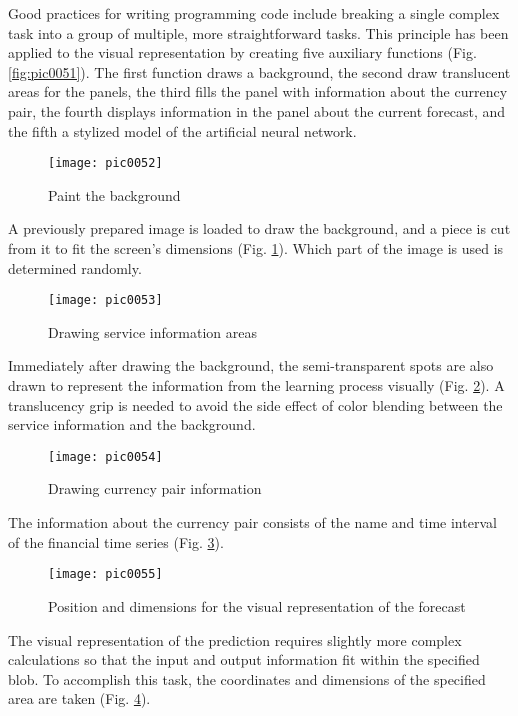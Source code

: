Good practices for writing programming code include breaking a single complex task into a group of multiple, more straightforward tasks. This principle has been applied to the visual representation by creating five auxiliary functions (Fig. \ref{fig:pic0051}). The first function draws a background, the second draw translucent areas for the panels, the third fills the panel with information about the currency pair, the fourth displays information in the panel about the current forecast, and the fifth a stylized model of the artificial neural network.

\begin{figure}[h]
\centering
\texttt{[image: pic0052]}
\caption{Paint the background}
\label{fig:pic0052}
\end{figure}
\FloatBarrier

A previously prepared image is loaded to draw the background, and a piece is cut from it to fit the screen's dimensions (Fig. \ref{fig:pic0052}). Which part of the image is used is determined randomly.

\begin{figure}[h]
\centering
\texttt{[image: pic0053]}
\caption{Drawing service information areas}
\label{fig:pic0053}
\end{figure}
\FloatBarrier

Immediately after drawing the background, the semi-transparent spots are also drawn to represent the information from the learning process visually (Fig. \ref{fig:pic0053}). A translucency grip is needed to avoid the side effect of color blending between the service information and the background.

\begin{figure}[h]
\centering
\texttt{[image: pic0054]}
\caption{Drawing currency pair information}
\label{fig:pic0054}
\end{figure}
\FloatBarrier

The information about the currency pair consists of the name and time interval of the financial time series (Fig. \ref{fig:pic0054}).

\begin{figure}[h]
\centering
\texttt{[image: pic0055]}
\caption{Position and dimensions for the visual representation of the forecast}
\label{fig:pic0055}
\end{figure}
\FloatBarrier

The visual representation of the prediction requires slightly more complex calculations so that the input and output information fit within the specified blob. To accomplish this task, the coordinates and dimensions of the specified area are taken (Fig. \ref{fig:pic0055}).

